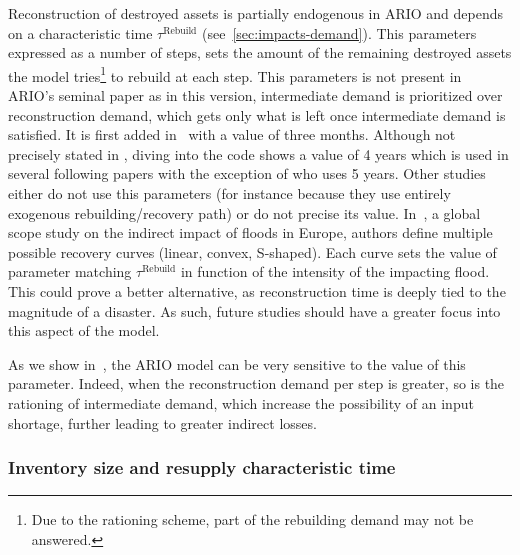 \documentclass[main.tex]{subfiles}
\begin{document}
Reconstruction of destroyed assets is partially endogenous in ARIO and depends
on a characteristic time $\tau^{\textrm{Rebuild}}$ (see~\cref{sec:impacts-demand}). This parameters expressed as
a number of steps, sets the amount of the remaining destroyed assets the model
tries\footnote{Due to the rationing scheme, part of the rebuilding demand may
  not be answered.} to rebuild at each step. This parameters is not present in
ARIO's seminal paper \parencite{hallegatte-2008-adapt-region} as
in this version, intermediate demand is prioritized over reconstruction demand,
which gets only what is left once intermediate demand is satisfied. It is first
added in~\textcite{ranger-2010-asses-poten} with a value of three
months. Although not precisely stated in
\textcite{hallegatte-2013-model-role}, diving into the code shows a
value of 4 years which is used in several following papers
\parencite{zhang-2018-analy-econom, koks-2014-integ-direc} with the exception of
\textcite{avelino-2019-chall-estim} who uses 5 years. Other studies
either do not use this parameters (for instance because they use entirely
exogenous rebuilding/recovery path) or do not precise its value.
In~\textcite{koks-2019-macroec-impac}, a global scope study on
the indirect impact of floods in Europe, authors define multiple possible
recovery curves (linear, convex, S-shaped).
Each curve sets the value of parameter matching $\tau^{\textrm{Rebuild}}$ in
function of the intensity of the impacting flood. This could prove a better
alternative, as reconstruction time is deeply tied to the magnitude of a
disaster. As such, future studies should have a greater focus into this aspect
of the model.

As we show in~, the ARIO model can be very
sensitive to the value of this parameter. Indeed, when the reconstruction demand
per step is greater, so is the rationing of intermediate demand, which increase
the possibility of an input shortage, further leading to greater indirect
losses.


\subsubsection{Inventory size and resupply characteristic time}
\label{sec:inventories-params}
\end{document}
